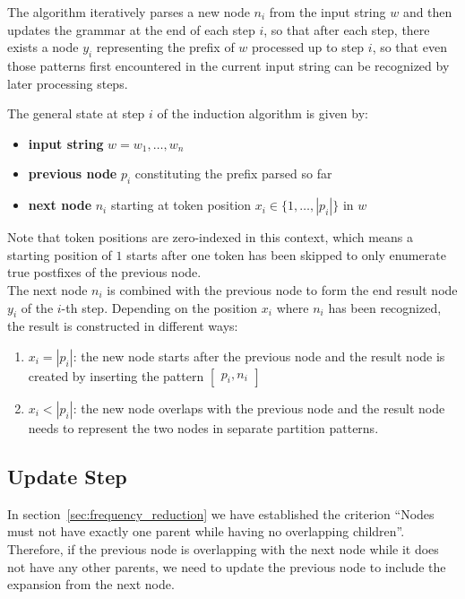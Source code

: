 The algorithm iteratively parses a new node $n_i$ from the input string $w$ and then updates the grammar at the end of each step $i$, so that after each step, there exists a node $y_i$ representing the prefix of $w$ processed up to step $i$,
so that even those patterns first encountered in the current input string can be recognized by later processing steps.\par
\noindent
The general state at step $i$ of the induction algorithm is given by:
\begin{itemize}[noitemsep,topsep=0pt]
    \item \textbf{input string} $w = w_1, \ldots, w_n$
    \item \textbf{previous node} $p_i$ constituting the prefix parsed so far
    \item \textbf{next node} $n_i$ starting at token position $x_i \in \{ 1, \ldots, |p_i| \}$ in $w$
\end{itemize}
Note that token positions are zero-indexed in this context, which means a starting position of $1$ starts after one token has been skipped to only enumerate true postfixes of the previous node.\\
\noindent
The next node $n_i$ is combined with the previous node to form the end result node $y_i$ of the $i$-th step. Depending on the position $x_i$ where $n_i$ has been recognized, the result is constructed in different ways:
\begin{enumerate}[noitemsep,topsep=0pt]
    \item $x_i = |p_i|$: the new node starts after the previous node and the result node is created by inserting the pattern 
        $\begin{bmatrix}
            p_i,n_i
        \end{bmatrix}$
    \item $x_i < |p_i|$: the new node overlaps with the previous node and the result node needs to represent the two nodes in separate partition patterns.
\end{enumerate}

\subsection{Update Step}
In section~\ref{sec:frequency_reduction} we have established the criterion ``Nodes must not have exactly one parent while having no overlapping children''. Therefore, if the previous node is overlapping with the next node while it does not have any other parents, we need to update the previous node to include the expansion from the next node.

